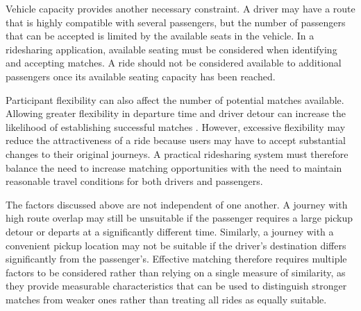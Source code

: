 Vehicle capacity provides another necessary constraint. A driver may have a route that is highly compatible with several passengers, but the number of passengers that can be accepted is limited by the available seats in the vehicle. In a ridesharing application, available seating must be considered when identifying and accepting matches. A ride should not be considered available to additional passengers once its available seating capacity has been reached.

Participant flexibility can also affect the number of potential matches available. Allowing greater flexibility in departure time and driver detour can increase the likelihood of establishing successful matches \citep{stiglic2016}. However, excessive flexibility may reduce the attractiveness of a ride because users may have to accept substantial changes to their original journeys. A practical ridesharing system must therefore balance the need to increase matching opportunities with the need to maintain reasonable travel conditions for both drivers and passengers.

The factors discussed above are not independent of one another. A journey with high route overlap may still be unsuitable if the passenger requires a large pickup detour or departs at a significantly different time. Similarly, a journey with a convenient pickup location may not be suitable if the driver's destination differs significantly from the passenger's. Effective matching therefore requires multiple factors to be considered rather than relying on a single measure of similarity, as they provide measurable characteristics that can be used to distinguish stronger matches from weaker ones rather than treating all rides as equally suitable.
